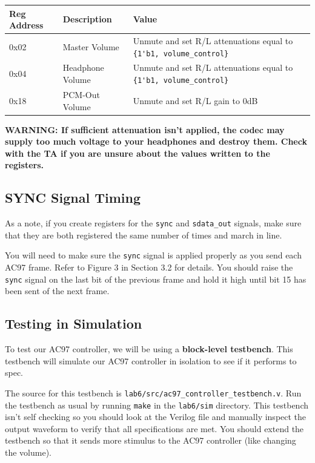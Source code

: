 \documentclass[11pt]{article}
\begin{document}
\begin{center}
	\begin{tabular}{ | l | l | p{8cm} |}
		\hline
		\textbf{Reg Address} & \textbf{Description} & \textbf{Value} \\ \hline
		0x02 & Master Volume & Unmute and set R/L attenuations equal to \verb|{1'b1, volume_control}| \\ \hline
		0x04 & Headphone Volume & Unmute and set R/L attenuations equal to \verb|{1'b1, volume_control}| \\ \hline
		0x18 & PCM-Out Volume & Unmute and set R/L gain to 0dB \\ \hline
	\end{tabular}
\end{center}

\textbf{WARNING: If sufficient attenuation isn't applied, the codec may supply too much voltage to your headphones and destroy them. Check with the TA if you are unsure about the values written to the registers.}

\subsection{SYNC Signal Timing}
As a note, if you create registers for the \verb|sync| and \verb|sdata_out| signals, make sure that they are both registered the same number of times and march in line.

You will need to make sure the \verb|sync| signal is applied properly as you send each AC97 frame. Refer to Figure 3 in Section 3.2 for details. You should raise the \verb|sync| signal on the last bit of the previous frame and hold it high until bit 15 has been sent of the next frame.

\subsection{Testing in Simulation}
To test our AC97 controller, we will be using a \textbf{block-level testbench}. This testbench will simulate our AC97 controller in isolation to see if it performs to spec.

The source for this testbench is \verb|lab6/src/ac97_controller_testbench.v|. Run the testbench as usual by running \verb|make| in the \verb|lab6/sim| directory. This testbench isn't self checking so you should look at the Verilog file and manually inspect the output waveform to verify that all specifications are met. You should extend the testbench so that it sends more stimulus to the AC97 controller (like changing the volume).
\end{document}
